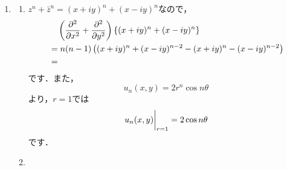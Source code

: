 \documentclass[a4paper,pdflatex,ja=standard]{bxjsarticle}
\begin{document}
\begin{enumerate}
\begin{enumerate}
  \end{enumerate}


  \item 

  \begin{enumerate}

    \item 

    $z^n+\bar{z}^n=(x+iy)^n+(x-iy)^n$なので，
    \begin{align}
      &\quad
      \left(  
        \pdv[2]{}{x}+\pdv[2]{}{y}
      \right)
      \left\{ (x+iy)^n+(x-iy)^n \right\}
      \nonumber
      \\
      &=
      n(n-1)
      \left( 
        (x+iy)^n+(x-iy)^{n-2}
        -(x+iy)^n-(x-iy)^{n-2}
      \right)
      \nonumber
      \\
      &=
    \end{align}
    です．また，
    \begin{equation}
      u_n(x,y)
      =
      2r^{n}\cos n\theta
      \label{un}
    \end{equation}
    より，$r=1$では
    \begin{equation}
      \left.
        u_n(x,y)        
        \vphantom{\dfrac{1}{2}}
      \right|_{r=1}
      =
      2\cos n\theta
    \end{equation}
    です．


    \item 


\end{enumerate}
\end{enumerate}
\end{document}
